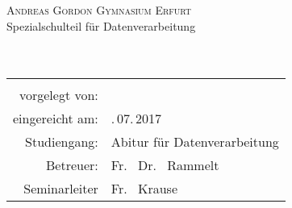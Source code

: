 
\begin{titlepage}
	\centering
	{\Large \textsc{Andreas Gordon Gymnasium Erfurt}}\\[3ex]
	{\Large Spezialschulteil für Datenverarbeitung}\\[3ex]
	\vfill
	{\Large \textbf{\artderausarbeitung}}\\[4ex]
	{\large \textbf{\themaderarbeit}}\\[5ex]
	\vfill
	\begin{tabular}{rl}
		\hline\\
		vorgelegt von:          & \quad \namedesautors\\[1,5ex]
		eingereicht am:         & \quad 29.\,07.\,2017\\[1,5ex]
		Studiengang:            & \quad Abitur für Datenverarbeitung\\[1,5ex]
		Betreuer:            	& \quad Fr. ~Dr. ~Rammelt\\[1,5ex]
		Seminarleiter           & \quad Fr. ~Krause \\[1,5ex]
	\end{tabular}
	\vfill
\end{titlepage}